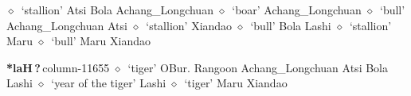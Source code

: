 \hspace{1ex}
         $\diamond$~`stallion'
         Atsi 
\hspace{1ex}
         Bola 
\hspace{1ex}
         Achang\_Longchuan 
\hspace{1ex}
         $\diamond$~`boar'
         Achang\_Longchuan 
\hspace{1ex}
         $\diamond$~`bull'
         Achang\_Longchuan 
\hspace{1ex}
         Atsi 
\hspace{1ex}
         $\diamond$~`stallion'
         Xiandao 
\hspace{1ex}
         $\diamond$~`bull'
         Bola 
\hspace{1ex}
         Lashi 
\hspace{1ex}
         $\diamond$~`stallion'
         Maru 
\hspace{1ex}
         $\diamond$~`bull'
         Maru 
\hspace{1ex}
         Xiandao 
  \item {\footnotesize \textbf{*laH\,?\,}}{\tiny column-11655}
         $\diamond$~`tiger'
         OBur. 
\hspace{1ex}
         Rangoon 
\hspace{1ex}
         Achang\_Longchuan 
\hspace{1ex}
         Atsi 
\hspace{1ex}
         Bola 
\hspace{1ex}
         Lashi 
\hspace{1ex}
         $\diamond$~`year of the tiger'
         Lashi 
\hspace{1ex}
         $\diamond$~`tiger'
         Maru 
\hspace{1ex}
         Xiandao 
